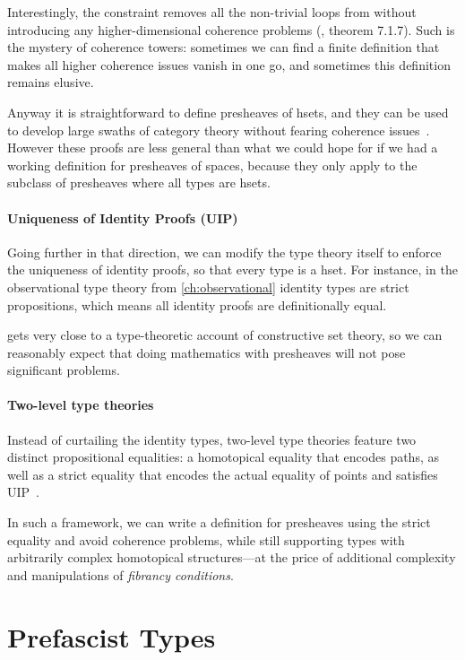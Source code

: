 Interestingly, the  constraint removes all the non-trivial 
loops from  without introducing any higher-dimensional coherence 
problems (, theorem 7.1.7). 
% 
Such is the mystery of coherence towers: sometimes we can find a finite 
definition that makes all higher coherence issues vanish in one go, and 
sometimes this definition remains elusive.

Anyway it is straightforward to define presheaves of hsets, and they can be used 
to develop large swaths of category theory without fearing coherence 
issues~. 
However these proofs are less general than what we could hope for if we had a 
working definition for presheaves of spaces, because they only apply to
the subclass of presheaves where all types are hsets.

\paragraph{Uniqueness of Identity Proofs (UIP)}
% 
Going further in that direction, we can modify the type theory itself to 
enforce the uniqueness of identity proofs, so that every type is a hset.
% 
For instance, in the observational type theory \SetoidCC from 
\cref{ch:observational} identity types are strict propositions,
which means all identity proofs are definitionally equal.

\SetoidCC gets very close to a type-theoretic account of constructive set 
theory, so we can reasonably expect that doing mathematics with presheaves 
will not pose significant problems.

\paragraph{Two-level type theories}
% 
Instead of curtailing the identity types, two-level type theories 
feature two distinct propositional equalities: a homotopical equality that 
encodes paths, as well as a strict equality that encodes the actual equality
of points and satisfies UIP~.

In such a framework, we can write a definition for presheaves using the strict equality
and avoid coherence problems, while still supporting types with arbitrarily
complex homotopical structures---at the price of additional complexity
and manipulations of \emph{fibrancy conditions}.

\section{Prefascist Types}
\label{sec:prefascist}

